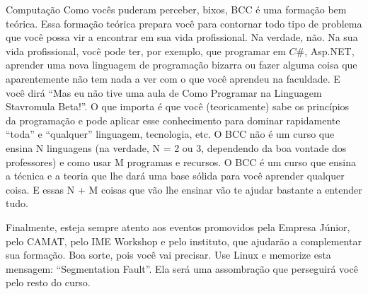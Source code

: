 \begin{subsecao}{Computação}
Como vocês puderam perceber, bixos, BCC é uma formação bem teórica. Essa
formação teórica prepara você para contornar todo tipo de problema que você
possa vir a encontrar em sua vida profissional. Na verdade, não. Na sua vida
profissional, você pode ter, por exemplo, que programar em $C\#$, Asp.NET,
aprender uma nova linguagem de programação bizarra ou fazer alguma coisa que
aparentemente não tem nada a ver com o que você aprendeu na faculdade. E você
dirá ``Mas eu não tive uma aula de Como Programar na Linguagem Stavromula
Beta!''. O que importa é que você (teoricamente) sabe os princípios da
programação e pode aplicar esse conhecimento para dominar rapidamente ``toda'' e
``qualquer'' linguagem, tecnologia, etc. O BCC não é um curso que ensina N
linguagens (na verdade, N = 2 ou 3, dependendo da boa vontade dos professores) e
como usar M programas e recursos. O BCC é um curso que ensina a técnica e a
teoria que lhe dará uma base sólida para você aprender qualquer coisa. E essas N
+ M coisas que vão lhe ensinar vão te ajudar bastante a entender tudo.

Finalmente, esteja sempre atento aos eventos promovidos pela Empresa Júnior,
pelo CAMAT, pelo IME Workshop e pelo instituto, que ajudarão a complementar sua
formação. Boa sorte, pois você vai precisar. Use Linux e memorize esta
mensagem: ``Segmentation Fault''. Ela será uma assombração que perseguirá você
pelo resto do curso.

\end{subsecao}
